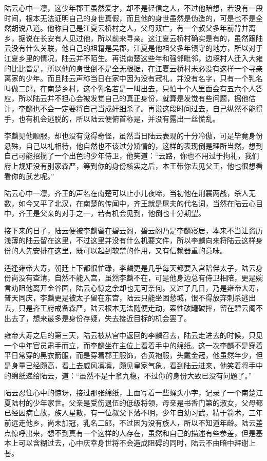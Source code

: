 陆云心中一凛，这少年郡王虽然爱才，却不是轻信之人，不过他暗想，若没有一段时间，根本无法证明自己的身世真假，而且他的身世虽然是伪造的，可是也不是全然胡说八道。他称自己是江夏云桥村之人，父母双亡，有一个叔父多年前背井离乡，据说在长安有人见过他，所以前来寻亲。这江夏云桥村确实是有的，虽然跟陆云没有什么关联，他自己的祖籍是吴郡，江夏是他祖父多年镇守的地方，所以对于江夏乡里的情况，陆云并不陌生。再说南楚这些年和强邻毗邻，边境村人迁入大雍的比比皆是，所以他的身世倒不是全无根据，在江夏云桥村未必没有这样一个寻亲离家的少年。而且陆云声称当日在家中因为没有冠礼，并没有名字，只有一个乳名叫做二郎，在南楚乡村，这个乳名若是一叫出去，只怕十个人里面会有五六个人答应，所以陆云并不担心会被发觉自己的真正身份，就算是发觉有些问题，据他估计，李麟也不会一定要将自己当成奸细杀了。再说这段时间过去，自己纵然不能得手，也有机会逃脱的，所以陆云便俯首称是，并没有露出一丝慌乱。

李麟见他顺服，却也没有觉得奇怪，虽然当日陆云表现的十分冷傲，可是毕竟身份悬殊，自己以礼相待，他自然也不该过分矫情的，这样的表现倒是理所当然，想到自己可能招揽了一个出色的少年侍卫，他笑道：“云路，你也不用过于拘礼，我们府上规矩没有别家森严，等到你的身份核实之后，本王带你去见父王，他也很想看看你的武艺呢。”

陆云心中一凛，齐王的声名在南楚可以止小儿夜啼，当初他在荆襄两战，杀人无数，如今又平了北汉，在南楚的传闻中，齐王就是屠夫的代名词，当然在陆云心目中，齐王是父亲的对手之一，若有机会见到，他倒也十分期望。

接下来的日子，陆云便被李麟留在碧云阁，碧云阁乃是李麟寝居，本来不当让资历浅薄的陆云留在这里，不过这里并没有什么机要文件，所以李麟向来将陆云这样身份的人先安排在这里，既可以起到软禁的作用，又有信赖器重的意味。

适逢雍帝大寿，朝廷上下都很忙碌，李麟更是几乎每天都要入宫陪伴太子，陆云身份尚没有查清，自然不能入宫，虽然李麟不在，可是他身边总有侍卫相陪，更是婉言劝阻他离开金谷园，陆云心惊之余却也无可奈何。又过了几日，乃是雍帝大寿，普天同庆，李麟更是被太子留在东宫，陆云只能坐困愁城，恨不得放弃刺杀逃出去，只是齐王府戒备森严，陆云根本无法随便走动，索性破罐破摔，留在碧云阁不出去了，想来最多是身份存疑，失去接近目标的机会罢了。

雍帝大寿之后的第三天，陆云被从宫中返回的李麟召去，陆云走进去的时候，只见一个中年官员肃手而立，而李麟坐在主位上看着手中的绵纸。这一次李麟不是穿着平日常穿的黑衣箭服，而是穿着郡王服饰，杏黄袍服，头戴金冠，他虽然年少，但是身量已经颇高，看上去威风凛凛，颇见皇家气象。看到陆云进来，他笑着将手中的绵纸递给陆云，道：“虽然不是十拿九稳，不过你的身份大致已没有问题了。”

陆云忍住心中的惊讶，接过那张绵纸，上面写着一些蝇头小字，记录了一个南楚江夏陆村的少年家世。父亲是受伤退伍的低级将领，母亲是书香门第的淑女，父母都已经因病亡故，族人星散，有一位叔父下落不明，少年自幼习武，精于箭术，三年前远走他乡，尚未加冠，乳名二郎，不过因为没有族人，所以不知道年龄。陆云差点惊呼出来，想不到真有一个这样的人存在，虽然和自己的描述有些参差，但是基本上可以含糊过去，心中庆幸身世将不会造成阻碍的同时，陆云不由暗中拜谢上苍。

